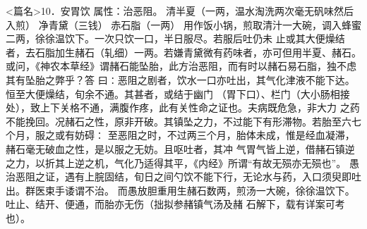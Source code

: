 \documentclass[a4paper,12pt,UTF8,twoside]{ctexbook}
\begin{document}
<篇名>10．安胃饮
属性：治恶阻。 
清半夏（一两，温水淘洗两次毫无矾味然后入煎） 净青黛（三钱） 赤石脂（一两） 
用作饭小锅，煎取清汁一大碗，调入蜂蜜二两，徐徐温饮下。一次只饮一口，半日服尽。若服后吐仍未 
止或其大便燥结者，去石脂加生赭石（轧细）一两。若嫌青黛微有药味者，亦可但用半夏、赭石。 
或问，《神农本草经》谓赭石能坠胎，此方治恶阻，而有时以赭石易石脂，独不虑其有坠胎之弊乎？答 
曰∶恶阻之剧者，饮水一口亦吐出，其气化津液不能下达。恒至大便燥结，旬余不通。其甚者，或结于幽门 
（胃下口）、栏门（大小肠相接处），致上下关格不通，满腹作疼，此有关性命之证也。夫病既危急，非大力 
之药不能挽回。况赭石之性，原非开破。其镇坠之力，不过能下有形滞物。若胎至六七个月，服之或有妨碍∶ 
至恶阻之时，不过两三个月，胎体未成，惟是经血凝滞，赭石毫无破血之性，是以服之无妨。且呕吐者，其冲 
气胃气皆上逆，借赭石镇逆之力，以折其上逆之机，气化乃适得其平，《内经》所谓“有故无殒亦无殒也”。 
愚治恶阻之证，遇有上脘固结，旬日之间勺饮不能下行，无论水与药，入口须臾即吐出。群医束手诿谓不治。 
而愚放胆重用生赭石数两，煎汤一大碗，徐徐温饮下。吐止、结开、便通，而胎亦无伤（拙拟参赭镇气汤及赭 
石解下，载有详案可考也）。 
\end{document}
